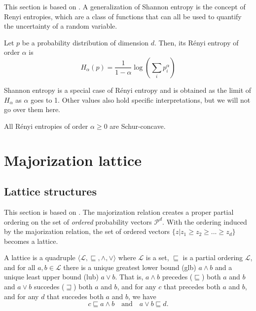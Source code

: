 This section is based on \cite{cover_elements_2006}. A generalization of Shannon entropy is the concept of Renyi entropies, which are a class of functions that can all be used to quantify the uncertainty of a random variable.

\begin{definition} \label{def:renyi_entropies}
    Let $p$ be a probability distribution of dimension $d$. Then, its R\'enyi entropy of order $\alpha$ is
    \begin{equation}
        H_\alpha(p) = \frac{1}{1 - \alpha} \log \left(\sum_i p_i^\alpha\right)
    \end{equation}
\end{definition}

Shannon entropy is a special case of R\'enyi entropy and is obtained as the limit of $H_\alpha$ as $\alpha$ goes to 1. Other values also hold specific interpretations, but we will not go over them here.

\begin{lemma}
    All R\'enyi entropies of order $\alpha \geq 0$ are Schur-concave.    
\end{lemma}



\section{Majorization lattice} \label{sec:majorization_lattice}

\subsection{Lattice structures}

This section is based on \cite{cicalese_supermodularity_2002}. The majorization relation creates a proper partial ordering on the set of \textit{ordered} probability vectors $\mathcal{P}^d$. With the ordering induced by the majorization relation, the set of ordered vectors $\{z | z_1 \geq z_2 \geq ... \geq z_d\}$ becomes a lattice.

\begin{definition}[Lattice] \label{def:lattice} %
    A lattice is a quadruple $\langle \mathcal{L}, \sqsubseteq, \wedge, \vee \rangle$ where $\mathcal{L}$ is a set, $\sqsubseteq$ is a partial ordering $\mathcal{L}$, and for all $a, b \in \mathcal{L}$ there is a unique greatest lower bound (glb) $a \wedge b$ and a unique least upper bound (lub) $a \vee b$. That is, $a \wedge b$ precedes ($\sqsubseteq$) both $a$ and $b$ and $a \vee b$ succedes ($\sqsupseteq$) both $a$ and $b$, and for any $c$ that precedes both $a$ and $b$, and for any $d$ that succedes both $a$ and $b$, we have
    \begin{equation}
        c \sqsubseteq a \wedge b \quad \text{and} \quad a \vee b \sqsubseteq d.
    \end{equation}
\end{definition}

